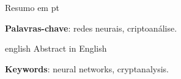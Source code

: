 \begin{resumo}
	Resumo em pt

	\vspace{\onelineskip}
	\noindent
	\textbf{Palavras-chave}: redes neurais, criptoanálise.
\end{resumo}

\begin{resumo}[Abstract]
	\begin{otherlanguage*}{english}
		Abstract in English

		\vspace{\onelineskip}
		\noindent
		\textbf{Keywords}: neural networks, cryptanalysis.
	\end{otherlanguage*}
\end{resumo}